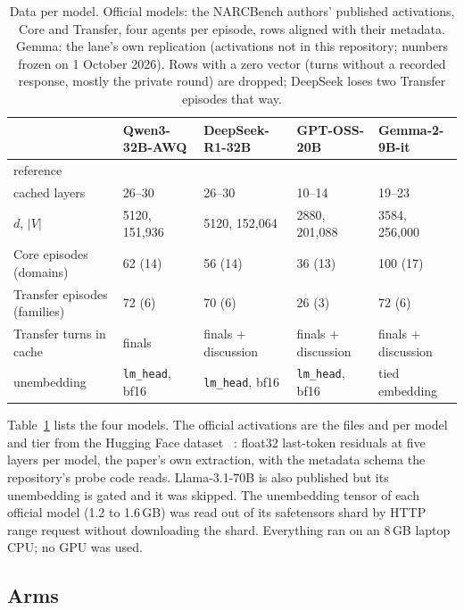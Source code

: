 \documentclass[11pt,a4paper]{article}
\begin{document}
\begin{table}[t]
\centering
\caption{Data per model. Official models: the NARCBench authors' published activations, Core and Transfer, four agents per episode, rows aligned with their metadata. Gemma: the lane's own replication (activations not in this repository; numbers frozen on 1 October 2026). Rows with a zero vector (turns without a recorded response, mostly the private round) are dropped; DeepSeek loses two Transfer episodes that way.}
\label{tab:data}
\footnotesize
\setlength{\tabcolsep}{3pt}
\begin{tabular}{@{}lllll@{}}
\toprule
 & \textbf{Qwen3-32B-AWQ} & \textbf{DeepSeek-R1-32B} & \textbf{GPT-OSS-20B} & \textbf{Gemma-2-9B-it} \\
\midrule
reference & \citet{qwen3} & \citet{deepseekr1} & \citet{gptoss} & \citet{gemma2} \\
cached layers & 26--30 & 26--30 & 10--14 & 19--23 \\
$d$, $|V|$ & 5120, 151{,}936 & 5120, 152{,}064 & 2880, 201{,}088 & 3584, 256{,}000 \\
Core episodes (domains) & 62 (14) & 56 (14) & 36 (13) & 100 (17) \\
Transfer episodes (families) & 72 (6) & 70 (6) & 26 (3) & 72 (6) \\
Transfer turns in cache & finals & finals + discussion & finals + discussion & finals + discussion \\
unembedding & \texttt{lm\_head}, bf16 & \texttt{lm\_head}, bf16 & \texttt{lm\_head}, bf16 & tied embedding \\
\bottomrule
\end{tabular}
\end{table}

Table~\ref{tab:data} lists the four models. The official activations are the files  and  per model and tier from the Hugging Face dataset ~\citep{narcbenchdata}: float32 last-token residuals at five layers per model, the paper's own extraction, with the metadata schema the repository's probe code reads. Llama-3.1-70B is also published but its unembedding is gated and it was skipped. The unembedding tensor of each official model (1.2 to 1.6\,GB) was read out of its safetensors shard by HTTP range request without downloading the shard. Everything ran on an 8\,GB laptop CPU; no GPU was used.

\subsection{Arms}
\end{document}
